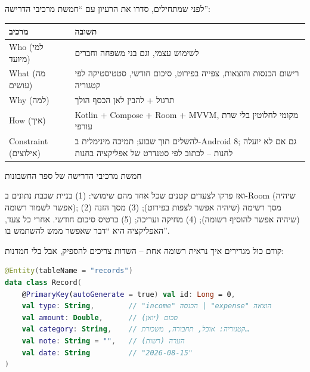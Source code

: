 


לפני שמתחילים, סדרו את הרעיון עם “חמשת מרכיבי הדרישה”:

\begin{center}
\begin{tabularx}{\linewidth}{|X|X|}
\hline
\textbf{מרכיב} & \textbf{תשובה} \tabularnewline
\hline
Who (למי מיועד) & לשימוש עצמי, וגם בני משפחה וחברים \tabularnewline
What (מה עושים) & רישום הכנסות והוצאות, צפייה בפירוט, סיכום חודשי, סטטיסטיקה לפי קטגוריה \tabularnewline
Why (למה) & תרגול + להבין לאן הכסף הולך \tabularnewline
How (איך) & ‏Kotlin + Compose + Room + MVVM, מקומי לחלוטין בלי שרת עורפי \tabularnewline
Constraint (אילוצים) & להשלים תוך שבוע; תמיכה מינימלית ב-Android 8; גם אם לא יועלה לחנות – לכתוב לפי סטנדרט של אפליקציה בחנות \tabularnewline
\hline
\end{tabularx}
\end{center}

\begin{center}\small\color{gray}חמשת מרכיבי הדרישה של ספר החשבונות\end{center}

ואז פרקו לצעדים קטנים שכל אחד מהם שימושי: (1) בניית שכבת נתונים ב-Room (שיהיה אפשר לשמור רשומה); (2) מסך רשימה (שיהיה אפשר לצפות בפירוט); (3) מסך הזנה (שיהיה אפשר להוסיף רשומה); (4) מחיקה ועריכה; (5) כרטיס סיכום חודשי. אחרי כל צעד, האפליקציה היא “דבר שאפשר ממש להשתמש בו”.


קודם כול מגדירים איך נראית רשומה אחת – השדות צריכים להספיק, אבל בלי חמדנות:

\begin{lstlisting}[language=Kotlin]
@Entity(tableName = "records")
data class Record(
    @PrimaryKey(autoGenerate = true) val id: Long = 0,
    val type: String,        // "income" הכנסה | "expense" הוצאה
    val amount: Double,      // סכום (יואן)
    val category: String,    // קטגוריה: אוכל, תחבורה, משכורת…
    val note: String = "",   // הערה (רשות)
    val date: String         // "2026-08-15"
)
\end{lstlisting}

